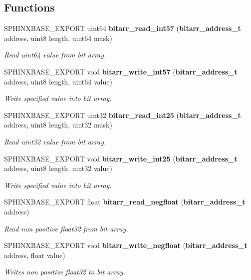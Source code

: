 \subsection*{Functions}
\begin{DoxyCompactItemize}
\item 
S\+P\+H\+I\+N\+X\+B\+A\+S\+E\+\_\+\+E\+X\+P\+O\+R\+T uint64 {\bf bitarr\+\_\+read\+\_\+int57} ({\bf bitarr\+\_\+address\+\_\+t} address, uint8 length, uint64 mask)
\begin{DoxyCompactList}\small\item\em Read uint64 value from bit array. \end{DoxyCompactList}\item 
S\+P\+H\+I\+N\+X\+B\+A\+S\+E\+\_\+\+E\+X\+P\+O\+R\+T void {\bf bitarr\+\_\+write\+\_\+int57} ({\bf bitarr\+\_\+address\+\_\+t} address, uint8 length, uint64 value)
\begin{DoxyCompactList}\small\item\em Write specified value into bit array. \end{DoxyCompactList}\item 
S\+P\+H\+I\+N\+X\+B\+A\+S\+E\+\_\+\+E\+X\+P\+O\+R\+T uint32 {\bf bitarr\+\_\+read\+\_\+int25} ({\bf bitarr\+\_\+address\+\_\+t} address, uint8 length, uint32 mask)
\begin{DoxyCompactList}\small\item\em Read uint32 value from bit array. \end{DoxyCompactList}\item 
S\+P\+H\+I\+N\+X\+B\+A\+S\+E\+\_\+\+E\+X\+P\+O\+R\+T void {\bf bitarr\+\_\+write\+\_\+int25} ({\bf bitarr\+\_\+address\+\_\+t} address, uint8 length, uint32 value)
\begin{DoxyCompactList}\small\item\em Write specified value into bit array. \end{DoxyCompactList}\item 
S\+P\+H\+I\+N\+X\+B\+A\+S\+E\+\_\+\+E\+X\+P\+O\+R\+T float {\bf bitarr\+\_\+read\+\_\+negfloat} ({\bf bitarr\+\_\+address\+\_\+t} address)
\begin{DoxyCompactList}\small\item\em Read non positive float32 from bit array. \end{DoxyCompactList}\item 
S\+P\+H\+I\+N\+X\+B\+A\+S\+E\+\_\+\+E\+X\+P\+O\+R\+T void {\bf bitarr\+\_\+write\+\_\+negfloat} ({\bf bitarr\+\_\+address\+\_\+t} address, float value)
\begin{DoxyCompactList}\small\item\em Writes non positive float32 to bit array. \end{DoxyCompactList}\item 

\end{DoxyCompactItemize}
